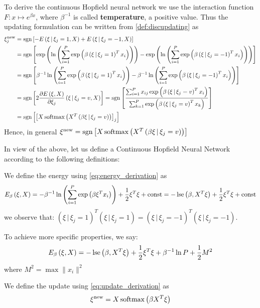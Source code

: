 \noindent To derive the continuous Hopfield neural network we use the interaction function $F:x\mapsto e^{\beta x}$, where $\beta^{-1}$ is called \textbf{temperature}, a positive value. Thus the updating formulation can be written from \cref{def:discupdating} as
\begin{align}
\xi^{\text{new}}_j &= \operatorname{sgn} \left[-E\left(\xi\,|\,\xi_j=1,X\right)+E\left(\xi\,|\,\xi_j=-1,X\right)\right] \nonumber \\
&= \operatorname{sgn} \left[\exp\left(\ln\left(\sum_{i=1}^{P} \exp\left(\beta\left(\xi\,|\,\xi_j=1\right)^Tx_i\right)\right)\right)-\exp\left(\ln\left(\sum_{i=1}^{P} \exp\left(\beta\left(\xi\,|\,\xi_j=-1\right)^Tx_i\right)\right)\right)\right] \nonumber \\
&= \operatorname{sgn} \left[\beta^{-1}\ln\left(\sum_{i=1}^{P} \exp\left(\beta\left(\xi\,|\,\xi_j=1\right)^Tx_i\right)\right)-\beta^{-1}\ln\left(\sum_{i=1}^{P} \exp\left(\beta\left(\xi\,|\,\xi_j=-1\right)^Tx_i\right)\right)\right] \label{eq:energy_derivation} \\
&= \operatorname{sgn} \left[2\frac{\partial E\left(\xi,X\right)}{\partial \xi_j}\left(\xi\,|\,\xi_j=v,X\right)\right]
= \operatorname{sgn} \left[\frac{\sum_{i=1}^{P}x_{ij}\exp\left(\beta\left(\xi\,|\,\xi_j=v\right)^Tx_i\right)}{\sum_{k=1}^{P}\exp\left(\beta\left(\xi\,|\,\xi_j=v\right)^Tx_k\right)}\right] \nonumber \\
&= \operatorname{sgn} \left[\left[X\operatorname{softmax}\left(X^T\left(\beta\xi\,|\,\xi_j=v\right)\right)\right]_j\right] \label{eq:update_derivation}
\end{align}
Hence, in general $\xi^{\text{new}} = \operatorname{sgn} \left[X\operatorname{softmax}\left(X^T\left(\beta\xi\,|\,\xi_j=v\right)\right)\right]$

\bigskip In view of the above, let us define a Continuous Hopfield Neural Network according to the following definitions:
\begin{definition}[Energy]
    We define the energy using \cref{eq:energy_derivation} as
    \begin{equation*}
        E_\beta\left(\xi,X\right) = -\beta^{-1}\ln\left(\sum_{i=1}^{P} \exp\left(\beta\xi^Tx_i\right)\right) + \frac12\xi^T\xi + \operatorname{const} = -\operatorname{lse}\left(\beta, X^T\xi\right) + \frac12\xi^T\xi + \operatorname{const}
    \end{equation*}
    we observe that: $\left(\xi\,|\,\xi_j=1\right)^T\left(\xi\,|\,\xi_j=1\right) = \left(\xi\,|\,\xi_j=-1\right)^T\left(\xi\,|\,\xi_j=-1\right)$.

    \noindent To achieve more specific properties, we say:
    \begin{equation}
        E_\beta\left(\xi,X\right) = -\operatorname{lse}\left(\beta, X^T\xi\right) + \frac12\xi^T\xi + \beta^{-1}\ln P + \frac12 M^2
    \end{equation}
    where $M^2 = \max \|x_i\|^2$
\end{definition}
\begin{definition}[updating]
    \label{def:updating}
    We define the update using \cref{eq:update_derivation} as
    \begin{equation}
        \label{eq:updating}
        \xi^{\text{new}} = X\operatorname{softmax}\left(\beta X^T\xi\right)
    \end{equation}
\end{definition}

